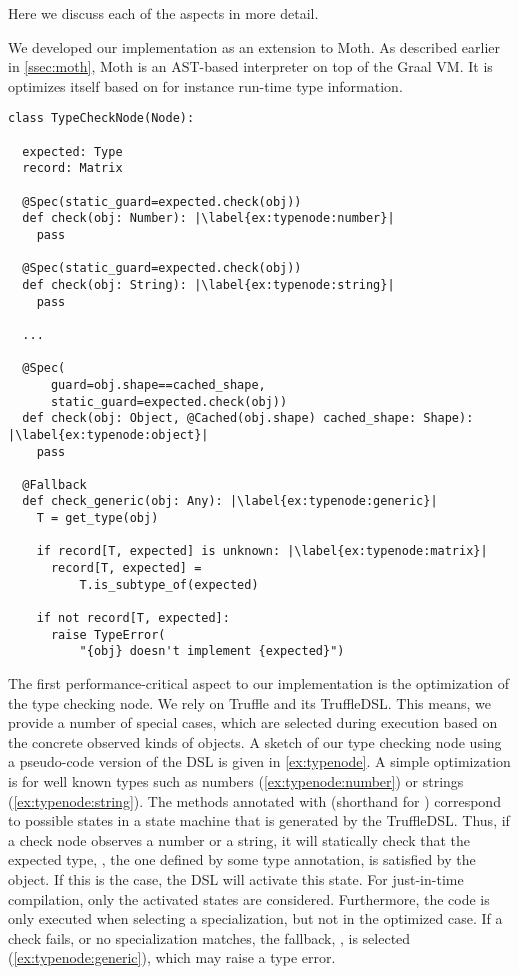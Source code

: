 Here we discuss each of the aspects in more detail.

We developed our implementation as an extension to Moth.
As described earlier in \cref{ssec:moth},
Moth is an AST-based interpreter on top of the Graal VM.
It is optimizes itself based on for instance run-time type information.

\begin{lstlisting}[label={ex:typenode},escapechar=|,caption={An illustration of the type checking node that support type checking},float,floatplacement=htbp]
class TypeCheckNode(Node):

  expected: Type
  record: Matrix

  @Spec(static_guard=expected.check(obj))
  def check(obj: Number): |\label{ex:typenode:number}|
    pass

  @Spec(static_guard=expected.check(obj))
  def check(obj: String): |\label{ex:typenode:string}|
    pass

  ...

  @Spec(
      guard=obj.shape==cached_shape,
      static_guard=expected.check(obj))
  def check(obj: Object, @Cached(obj.shape) cached_shape: Shape): |\label{ex:typenode:object}|
    pass
  
  @Fallback
  def check_generic(obj: Any): |\label{ex:typenode:generic}|
    T = get_type(obj)
    
    if record[T, expected] is unknown: |\label{ex:typenode:matrix}|
      record[T, expected] =
          T.is_subtype_of(expected)

    if not record[T, expected]:
      raise TypeError(
          "{obj} doesn't implement {expected}")
\end{lstlisting}

The first performance-critical aspect to our implementation
is the optimization of the type checking node.
We rely on Truffle and its TruffleDSL\citep{humer2014domainspecific}.
This means, we provide a number of special cases,
which are selected during execution based on the concrete observed
kinds of objects.
A sketch of our type checking node using a pseudo-code version of the DSL
is given in \cref{ex:typenode}.
A simple optimization is for well known types such as
numbers (\cref{ex:typenode:number}) or strings (\cref{ex:typenode:string}).
The methods annotated with  (shorthand for )
correspond to possible states in a state machine that is generated by the
TruffleDSL.
Thus, if a check node observes a number or a string,
it will statically check that the expected type,
\ie, the one defined by some type annotation,
is satisfied by the object.
If this is the case, the DSL will activate this state.
For just-in-time compilation, only the activated states are considered.
Furthermore, the  code is only executed when selecting
a specialization, but not in the optimized case.
If a check fails, or no specialization matches, the fallback,
\ie,  is selected (\cref{ex:typenode:generic}),
which may raise a type error.

